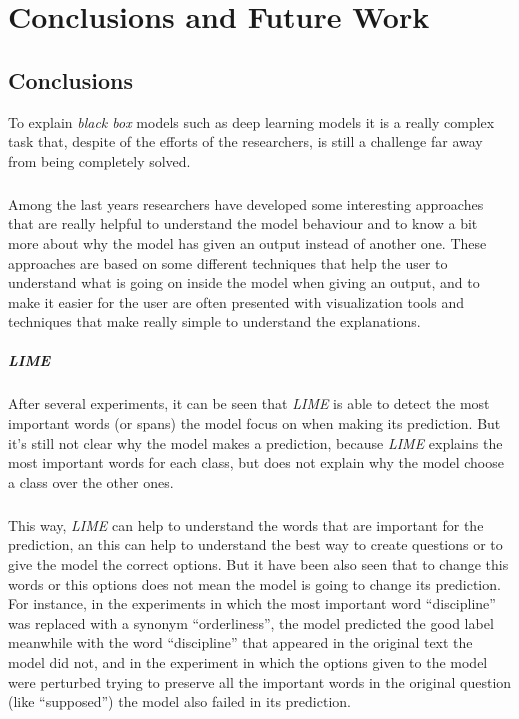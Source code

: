 
\chapter{Conclusions and Future Work}
\label{ch:ConclusionsAndFutureWork}
\section{Conclusions}
\label{sec:Conclusions}
\noindent To explain \emph{black box} models such as deep learning models it is a really complex task that, despite of the efforts of the researchers, is still a challenge far away from being completely solved. 
\paragraph{}
Among the last years researchers have developed some interesting approaches that are really helpful to understand the model behaviour and to know a bit more about why the model has given an output instead of another one. These approaches are based on some different techniques that help the user to understand what is going on inside the model when giving an output, and to make it easier for the user are often presented with visualization tools and techniques that make really simple to understand the explanations. 
\paragraph{LIME} After several experiments, it can be seen that \emph{LIME} is able to detect the most important words (or spans) the model focus on when making its prediction. But it's still not clear why the model makes a prediction, because \emph{LIME} explains the most important words for each class, but does not explain why the model choose a class over the other ones.
\paragraph{}
This way, \emph{LIME} can help to understand the words that are important for the prediction, an this can help to understand the best way to create questions or to give the model the correct options. But it have been also seen that to change this words or this options does not mean the model is going to change its prediction. For instance, in the experiments in which the most important word ``discipline'' was replaced with a synonym ``orderliness'', the model predicted the good label meanwhile with the word ``discipline'' that appeared in the original text the model did not, and in the experiment in which the options given to the model were perturbed trying to preserve all the important words in the original question (like ``supposed'') the model also failed in its prediction.
